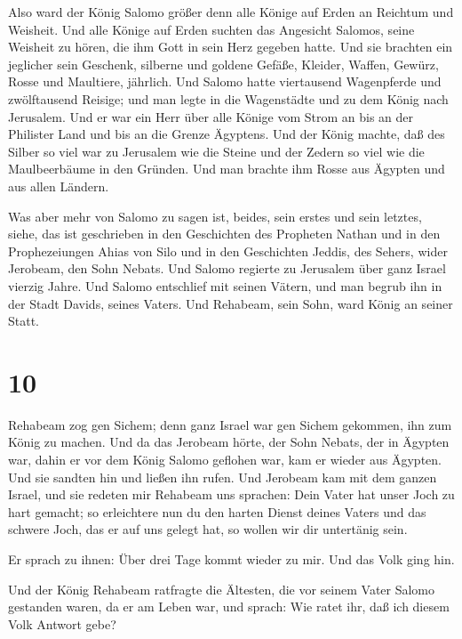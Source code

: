  Also ward der König Salomo größer denn alle Könige auf
Erden an Reichtum und Weisheit.  Und alle Könige auf Erden
suchten das Angesicht Salomos, seine Weisheit zu hören, die ihm Gott in
sein Herz gegeben hatte.  Und sie brachten ein jeglicher
sein Geschenk, silberne und goldene Gefäße, Kleider, Waffen, Gewürz,
Rosse und Maultiere, jährlich.  Und Salomo hatte
viertausend Wagenpferde und zwölftausend Reisige; und man legte in die
Wagenstädte und zu dem König nach Jerusalem.  Und er war
ein Herr über alle Könige vom Strom an bis an der Philister Land und bis
an die Grenze Ägyptens.  Und der König machte, daß des
Silber so viel war zu Jerusalem wie die Steine und der Zedern so viel
wie die Maulbeerbäume in den Gründen.  Und man brachte ihm
Rosse aus Ägypten und aus allen Ländern.

 Was aber mehr von Salomo zu sagen ist, beides, sein erstes
und sein letztes, siehe, das ist geschrieben in den Geschichten des
Propheten Nathan und in den Prophezeiungen Ahias von Silo und in den
Geschichten Jeddis, des Sehers, wider Jerobeam, den Sohn Nebats.
 Und Salomo regierte zu Jerusalem über ganz Israel vierzig
Jahre.  Und Salomo entschlief mit seinen Vätern, und man
begrub ihn in der Stadt Davids, seines Vaters. Und Rehabeam, sein Sohn,
ward König an seiner Statt.

\hypertarget{section-9}{%
\section{10}\label{section-9}}

 Rehabeam zog gen Sichem; denn ganz Israel war gen Sichem
gekommen, ihn zum König zu machen.  Und da das Jerobeam
hörte, der Sohn Nebats, der in Ägypten war, dahin er vor dem König
Salomo geflohen war, kam er wieder aus Ägypten.  Und sie
sandten hin und ließen ihn rufen. Und Jerobeam kam mit dem ganzen
Israel, und sie redeten mir Rehabeam uns sprachen:  Dein
Vater hat unser Joch zu hart gemacht; so erleichtere nun du den harten
Dienst deines Vaters und das schwere Joch, das er auf uns gelegt hat, so
wollen wir dir untertänig sein.

 Er sprach zu ihnen: Über drei Tage kommt wieder zu mir. Und
das Volk ging hin.

 Und der König Rehabeam ratfragte die Ältesten, die vor
seinem Vater Salomo gestanden waren, da er am Leben war, und sprach: Wie
ratet ihr, daß ich diesem Volk Antwort gebe?

